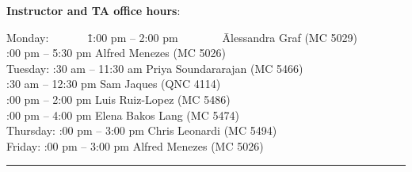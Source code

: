 \documentclass[11pt]{article}
\begin{document}
\vspace*{4mm}
\noindent
{\bf Instructor and TA office hours}:
\begin{tabbing}
Monday:~~~~~~~\=1:00 pm -- 2:00 pm~~~~~~~~\= Alessandra Graf (MC 5029)\\
:00 pm -- 5:30 pm \> Alfred Menezes (MC 5026)\\
Tuesday: :30 am -- 11:30 am \> Priya Soundararajan (MC 5466)\\
:30 am -- 12:30 pm \> Sam Jaques (QNC 4114)\\
:00 pm -- 2:00 pm \> Luis Ruiz-Lopez (MC 5486)\\
:00 pm -- 4:00 pm \> Elena Bakos Lang (MC 5474)\\
Thursday: :00 pm -- 3:00 pm \> Chris Leonardi (MC 5494)\\
Friday: :00 pm -- 3:00 pm \> Alfred Menezes (MC 5026)
\end{tabbing}

\hfill\hrule
\end{document}
